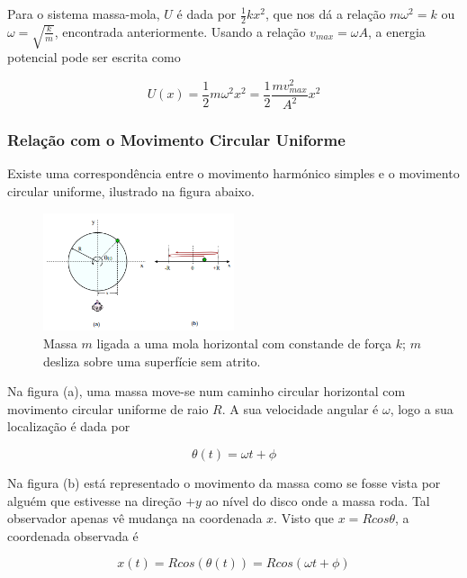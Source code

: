 Para o sistema massa-mola, $U$ é dada por $\frac{1}{2}kx^2$, que nos dá a relação $m\omega^2=k$ ou $\omega=\sqrt{\frac{k}{m}}$, encontrada anteriormente. Usando a relação $v_{max}=\omega A$, a energia potencial pode ser escrita como

\begin{equation}
    U(x)=\frac{1}{2}m\omega^2x^2=\frac{1}{2}\frac{mv^2_{max}}{A^2}x^2
\end{equation}

\subsubsection{Relação com o Movimento Circular Uniforme}

Existe uma correspondência entre o movimento harmónico simples e o movimento circular uniforme, ilustrado na figura abaixo.

\begin{figure}[h!]
    \centering
    \includegraphics[width=0.5\textwidth]{10/fig/mhs-mcu.png}
    \caption{Massa $m$ ligada a uma mola horizontal com constande de força $k$; $m$ desliza sobre uma superfície sem atrito.}
\end{figure}

Na figura (a), uma massa move-se num caminho circular horizontal com movimento circular uniforme de raio $R$. A sua velocidade angular é $\omega$, logo a sua localização é dada por

\begin{equation*}
    \theta(t)=\omega t + \phi
\end{equation*}

Na figura (b) está representado o movimento da massa como se fosse vista por alguém que estivesse na direção $+y$ ao nível do disco onde a massa roda. Tal observador apenas vê mudança na coordenada $x$. Visto que $x=Rcos\theta$, a coordenada observada é

\begin{equation*}
    x(t)=Rcos(\theta(t))=Rcos(\omega t + \phi)
\end{equation*}

